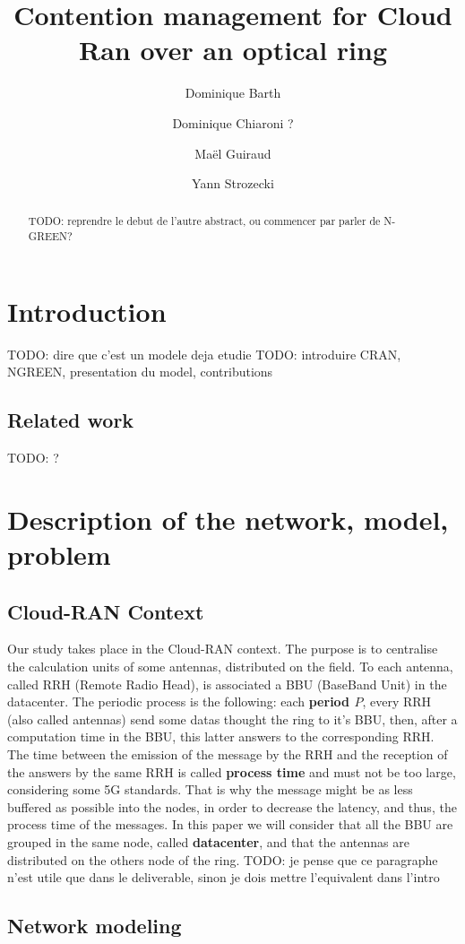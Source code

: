 \documentclass[a4paper,10pt,french,english]{article}
\title{Contention management for Cloud Ran over an optical ring}
\author[1]{Dominique Barth}
\author[2]{Dominique Chiaroni ?}
\author[1]{Ma\"el Guiraud}
\author[1]{Yann Strozecki}
\affil[1]{David Laboratory, UVSQ}
\affil[2]{Nokia Bell Labs France}
\newcommand{\todo}[1]{{\color{red} TODO: {#1}}}
\begin{document}
\maketitle


\begin{abstract}
\todo{reprendre le debut de l'autre abstract, ou commencer par parler de N-GREEN?}
\end{abstract}

\section{Introduction}
\todo{dire que c'est un modele deja etudie}
\todo{introduire CRAN, NGREEN, presentation du model, contributions}
\subsection*{Related work}
\todo{?}

\section{Description of the network, model, problem}
    \subsection{Cloud-RAN Context}
    Our study takes place in the Cloud-RAN context. The purpose is to centralise the calculation units of some antennas, distributed on the field. To each antenna, called RRH (Remote Radio Head), is associated a BBU (BaseBand Unit) in the datacenter.
      The periodic process is the following: each {\bf period $P$}, every RRH (also called antennas) send some datas thought the ring to it's BBU, then, after a computation time in the BBU, this latter answers to the corresponding RRH. 
      The time between the emission of the message by the RRH and the reception of the answers by the same RRH is called {\bf process time} and must not be too large, considering some 5G standards. That is why the message might be as less buffered as possible into the nodes, in order to decrease the latency, and thus, the process time of the messages.
      In this paper we will consider that all the BBU are grouped in the same node, called {\bf datacenter}, and that the antennas are distributed on the others node of the ring.
      \todo{je pense que ce paragraphe n'est utile que dans le deliverable, sinon je dois mettre l'equivalent dans l'intro}
  
  
  \subsection{Network modeling}
\end{document}
